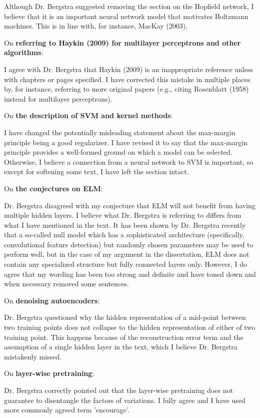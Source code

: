 \documentclass[11pt, oneside]{essay}
\begin{document}
Although Dr. Bergstra suggested removing the section on the Hopfield
network, I believe that it is an important neural network
model that motivates Boltzmann machines. This is in line
with, for instance, MacKay (2003).

On \textbf{referring to Haykin (2009) for multilayer
perceptrons and other algorithms}:

I agree with Dr. Bergstra that Haykin (2009) is an
inappropriate reference unless with chapters or pages
specified. I have corrected this mistake in multiple places
by, for instance, referring to more original papers (e.g., citing
Rosenblatt (1958) instead for multilayer perceptrons).

On \textbf{the description of SVM and kernel methods}:

I have changed the potentially misleading statement about
the max-margin principle being a good regularizer. I have
revised it to say that the max-margin principle provides a
well-formed ground on which a model can be selected.
Otherwise, I believe a connection from a neural network to
SVM is important, so except for softening some text, I have
left the section intact.

On \textbf{the conjectures on ELM}:

Dr. Bergstra disagreed with my conjecture that ELM will not
benefit from having multiple hidden layers. I believe what
Dr. Bergstra is referring to differs from what I have
mentioned in the text. It has been shown by Dr. Bergstra
recently that a so-called null model which has a
sophisticated architecture (specifically, convolutional
feature detection) but randomly chosen parameters may be
used to perform well, but in the case of my argument in the
dissertation, ELM does not contain any specialized structure
but fully connected layers only. However, I do agree that my
wording has been too strong and definite and have toned down
and when necessary removed some sentences.

On \textbf{denoising autoencoders}:

Dr. Bergstra questioned why the hidden representation of a
mid-point between two training points does not collapse to the
hidden representation of either of two training point. This
happens because of the reconstruction error term and the
assumption of a single hidden layer in the text, which I
believe Dr. Bergstra mistakenly missed. 

On \textbf{layer-wise pretraining}:

Dr. Bergstra correctly pointed out that the layer-wise
pretraining does not guarantee to disentangle the factors of
variations. I fully agree and I have used more commonly
agreed term 'encourage'.
\end{document}
